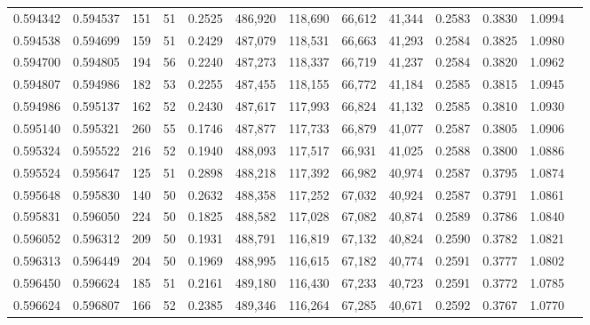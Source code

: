 \begin{tabular}{rrrrrrrrrrrrr}
0.594342 & 0.594537 &   151 &  51 &                                     0.2525 & 486,920 & 118,690 &  66,612 &  41,344 & 0.2583 & 0.3830 & 1.0994 \\
0.594538 & 0.594699 &   159 &  51 &                                     0.2429 & 487,079 & 118,531 &  66,663 &  41,293 & 0.2584 & 0.3825 & 1.0980 \\
0.594700 & 0.594805 &   194 &  56 &                                     0.2240 & 487,273 & 118,337 &  66,719 &  41,237 & 0.2584 & 0.3820 & 1.0962 \\
0.594807 & 0.594986 &   182 &  53 &                                     0.2255 & 487,455 & 118,155 &  66,772 &  41,184 & 0.2585 & 0.3815 & 1.0945 \\
0.594986 & 0.595137 &   162 &  52 &                                     0.2430 & 487,617 & 117,993 &  66,824 &  41,132 & 0.2585 & 0.3810 & 1.0930 \\
0.595140 & 0.595321 &   260 &  55 &                                     0.1746 & 487,877 & 117,733 &  66,879 &  41,077 & 0.2587 & 0.3805 & 1.0906 \\
0.595324 & 0.595522 &   216 &  52 &                                     0.1940 & 488,093 & 117,517 &  66,931 &  41,025 & 0.2588 & 0.3800 & 1.0886 \\
0.595524 & 0.595647 &   125 &  51 &                                     0.2898 & 488,218 & 117,392 &  66,982 &  40,974 & 0.2587 & 0.3795 & 1.0874 \\
0.595648 & 0.595830 &   140 &  50 &                                     0.2632 & 488,358 & 117,252 &  67,032 &  40,924 & 0.2587 & 0.3791 & 1.0861 \\
0.595831 & 0.596050 &   224 &  50 &                                     0.1825 & 488,582 & 117,028 &  67,082 &  40,874 & 0.2589 & 0.3786 & 1.0840 \\
0.596052 & 0.596312 &   209 &  50 &                                     0.1931 & 488,791 & 116,819 &  67,132 &  40,824 & 0.2590 & 0.3782 & 1.0821 \\
0.596313 & 0.596449 &   204 &  50 &                                     0.1969 & 488,995 & 116,615 &  67,182 &  40,774 & 0.2591 & 0.3777 & 1.0802 \\
0.596450 & 0.596624 &   185 &  51 &                                     0.2161 & 489,180 & 116,430 &  67,233 &  40,723 & 0.2591 & 0.3772 & 1.0785 \\
0.596624 & 0.596807 &   166 &  52 &                                     0.2385 & 489,346 & 116,264 &  67,285 &  40,671 & 0.2592 & 0.3767 & 1.0770 \\

\end{tabular}
